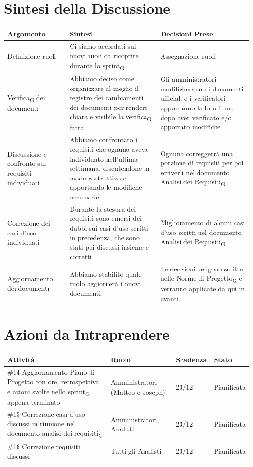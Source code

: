 \documentclass[a4paper,12pt]{article}
\newcommand{\gls}[1]{#1\textsubscript{G}}
\begin{document}
\section*{ Sintesi della Discussione}

\begin{longtable}{|p{}|p{}|p{}|}
\hline
\textbf{Argomento} & \textbf{Sintesi} & \textbf{Decisioni Prese} \\ \hline
Definizione ruoli & Ci siamo accordati sui nuovi ruoli da ricoprire durante lo \gls{sprint} & Assegnazione ruoli   \\ \hline

\gls{Verifica} dei documenti & Abbiamo deciso come organizzare al meglio il registro dei cambiamenti dei documenti per rendere chiara e visibile la \gls{verifica} fatta & Gli amministratori modificheranno i documenti ufficiali e i verificatori apporranno la loro firma dopo aver verificato e/o apportato modifiche \\ \hline

Discussione e confronto sui requisiti individuati & Abbiamo confrontato i requisiti che ognuno aveva individuato nell'ultima settimana, discutendone in modo costruttivo e apportando le modifiche necessarie & Ognuno correggerrà una porzione di requisiti per poi scriverli nel documento \gls{Analisi dei Requisiti} \\ \hline

Correzione dei casi d'uso individuati & Durante la stesura dei requisiti sono emersi dei dubbi sui casi d'uso scritti in precedenza, che sono stati poi discussi insieme e corretti & Miglioramento di alcuni casi d'uso scritti nel documento \gls{Analisi dei Requisiti} \\ \hline

Aggiornamento dei documenti & Abbiamo stabilito quale ruolo aggiornerà i nuovi documenti & Le decisioni vengono scritte nelle \gls{Norme di Progetto} e verranno applicate da qui in avanti \\ \hline

\end{longtable}

\section*{ Azioni da Intraprendere}

\begin{longtable}{|p{}|p{}|p{}|p{}|}
\hline
\textbf{Attività} & \textbf{Ruolo} & \textbf{Scadenza} & \textbf{Stato} \\ \hline
\#14 Aggiornamento Piano di Progetto con ore, retrospettiva e azioni svolte nello \gls{sprint} appena terminato & Amministratori (Matteo e Joseph)  & 23/12 & Pianificata  \\ \hline
\#15 Correzione casi d'uso discussi in riunione nel documento \gls{analisi dei requisiti} & Amministratori, Analisti & 23/12 & Pianificata  \\ \hline
\#16 Correzione requisiti discussi & Tutti gli Analisti & 23/12 & Pianificata \\ \hline


\end{longtable}
\end{document}
